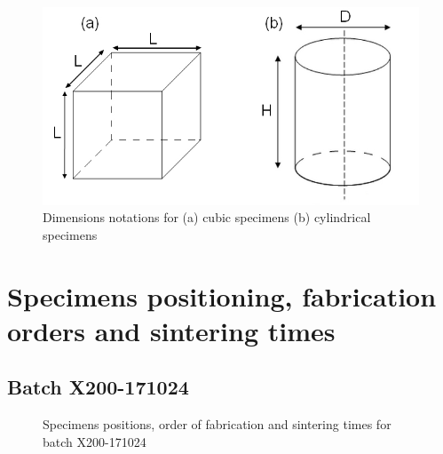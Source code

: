 
\begin{figure}[ht]
\centering
\includegraphics[scale=0.58]{Images/cc}
\caption[Dimensions notations for (a) cubic specimens (b) cylindrical specimens]{Dimensions notations for (a) cubic specimens (b) cylindrical specimens}
\label{fig:cc}
\end{figure}

 
\section{Specimens positioning, fabrication orders and sintering times}
\label{mda}
\subsection{Batch X200-171024}

\begin{figure}[ht]
\centering
\noindent{}
\decoRule
\caption[Specimens positions, order of fabrication and sintering times for batch X200-171024]{Specimens positions, order of fabrication and sintering times for batch X200-171024}
\label{fig:171024-cad}
\end{figure}

